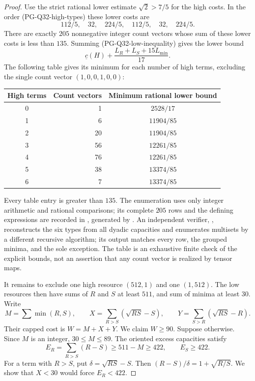 \begin{proof}
Use the strict rational lower estimate $\sqrt2>7/5$ for the high
costs. In the order (PG-Q32-high-types) these lower costs are
\[
 112/5,\quad32,\quad224/5,\quad112/5,\quad32,\quad224/5.
\]
There are exactly $205$ nonnegative integer count vectors whose
sum of these lower costs is less than $135$. Summing
(PG-Q32-low-inequality) gives the lower bound
\[
 \underline c(H)+\frac{L_R+L_S+15L_{\min}}{17}.
 \tag{PG-Q32-enumerated-bound}
\]
The following table gives its minimum for each number of high
terms, excluding the single count vector $(1,0,0,1,0,0)$:
\begin{center}
\begin{tabular}{c|r|c}
High terms & Count vectors & Minimum rational lower bound\\\hline
0&1&$2528/17$\\
1&6&$11904/85$\\
2&20&$11904/85$\\
3&56&$12261/85$\\
4&76&$12261/85$\\
5&38&$13374/85$\\
6&7&$13374/85$
\end{tabular}
\end{center}
Every table entry is greater than $135$. The enumeration uses
only integer arithmetic and rational comparisons; its complete
$205$ rows and the defining expressions are recorded in
, generated by
. An independent verifier,
, reconstructs the six
types from all dyadic capacities and enumerates multisets by a
different recursive algorithm; its output
 matches every
row, the grouped minima, and the sole exception. The table is an
exhaustive finite check of the explicit bounds, not an assertion
that any count vector is realized by tensor maps.

It remains to exclude one high resource $(512,1)$ and one
$(1,512)$. The low resources then have sums of $R$ and $S$ at
least $511$, and sum of minima at least $30$. Write
\[
 M=\sum\min(R,S),\qquad
 X=\sum_{R>S}(\sqrt{RS}-S),\qquad
 Y=\sum_{S>R}(\sqrt{RS}-R).
\]
Their capped cost is $W=M+X+Y$. We claim $W\geq90$.
Suppose otherwise. Since $M$ is an integer, $30\leq M\leq89$.
The oriented excess capacities satisfy
\[
 E_R=\sum_{R>S}(R-S)\geq511-M\geq422,
 \qquad E_S\geq422.
\]
For a term with $R>S$, put $\delta=\sqrt{RS}-S$. Then
$(R-S)/\delta=1+\sqrt{R/S}$. We show that $X<30$ would force
$E_R<422$.


\end{proof}
